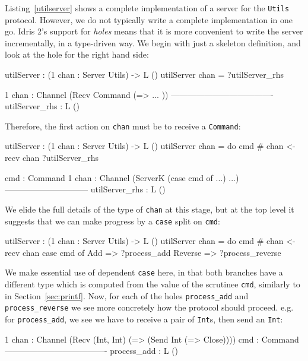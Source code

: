 Listing~\ref{utilserver} shows a complete implementation of a server for
the \texttt{Utils} protocol. However, we do not typically write a complete
implementation in one go. Idris 2's support for \emph{holes} means that it
is more convenient to write the server incrementally, in a type-driven
way. We begin with just a skeleton definition, and look at the hole for the
right hand side:

\begin{code}
utilServer : (1 chan : Server Utils) -> L ()
utilServer chan = ?utilServer_rhs

 1 chan : Channel (Recv Command (\res => ... ))
-------------------------------------
utilServer_rhs : L ()
\end{code}

Therefore, the first action on \texttt{chan} must be to receive a
\texttt{Command}:

\begin{code}
utilServer : (1 chan : Server Utils) -> L ()
utilServer chan
    = do cmd # chan <- recv chan
         ?utilServer_rhs

   cmd : Command
 1 chan : Channel (ServerK (case cmd of ...) ...)
------------------------------
utilServer_rhs : L ()                                       
\end{code}

We elide the full details of the type of \texttt{chan} at this stage, but at
the top level it suggests that we can make progress by a \texttt{case} split on
\texttt{cmd}:

\begin{code}
utilServer : (1 chan : Server Utils) -> L ()
utilServer chan
    = do cmd # chan <- recv chan
         case cmd of
              Add => ?process_add
              Reverse => ?process_reverse
\end{code}

We make essential use of dependent \texttt{case} here, in that both
branches have a different type which is computed from the value of the
scrutinee \texttt{cmd}, similarly to  in
Section~\ref{sec:printf}.
Now, for each of the holes \texttt{process\_add} and \texttt{process\_reverse}
we see more concretely how the protocol should proceed. e.g. for
\texttt{process\_add}, we see we have to receive a pair of \texttt{Int}s, then
send an \texttt{Int}:

\begin{code}
   1 chan : Channel (Recv (Int, Int) (\res => 
                    (Send Int (\res => Close))))
     cmd : Command
  -------------------------------------
  process_add : L () 
\end{code}

